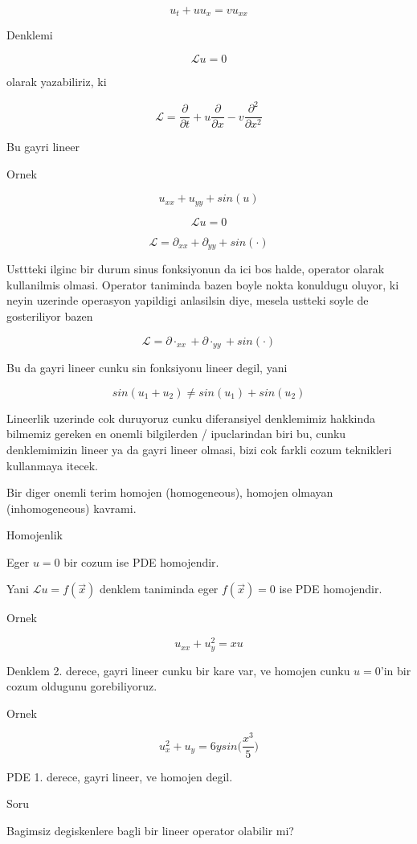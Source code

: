 \documentclass[12pt,fleqn]{article}
\begin{document}
\[ u_t + u u_x = v u_{xx} \]

Denklemi 

\[ \mathcal{L}u = 0 \]

olarak yazabiliriz, ki 

\[ \mathcal{L} = \frac{\partial }{\partial t} + 
u \frac{\partial }{\partial x} - v\frac{\partial ^2}{\partial x^2}
\]

Bu gayri lineer

Ornek

\[ u_{xx} + u_{yy} + sin(u) \]

\[ \mathcal{L} u = 0 \]

\[ \mathcal{L} = \partial_{xx} + \partial_{yy} + sin(\cdot) \]

Usttteki ilginc bir durum sinus fonksiyonun da ici bos halde, operator
olarak kullanilmis olmasi. Operator taniminda bazen boyle nokta konuldugu
oluyor, ki neyin uzerinde operasyon yapildigi anlasilsin diye, mesela
ustteki soyle de gosteriliyor bazen

\[ \mathcal{L} = \partial\cdot_{xx} + \partial\cdot_{yy} + sin(\cdot) \]

Bu da gayri lineer cunku sin fonksiyonu lineer degil, yani

\[ sin(u_1 + u_2) \ne sin(u_1) + sin(u_2) \]

Lineerlik uzerinde cok duruyoruz cunku diferansiyel denklemimiz hakkinda
bilmemiz gereken en onemli bilgilerden / ipuclarindan biri bu, cunku
denklemimizin lineer ya da gayri lineer olmasi, bizi cok farkli cozum
teknikleri kullanmaya itecek.

Bir diger onemli terim homojen (homogeneous), homojen olmayan
(inhomogeneous) kavrami. 

Homojenlik

Eger $u=0$ bir cozum ise PDE homojendir. 

Yani $\mathcal{L} u = f(\vec{x})$ denklem taniminda eger $f(\vec{x})=0$ ise PDE homojendir. 

Ornek

\[ u_{xx} + u_y^2 = xu \]

Denklem 2. derece, gayri lineer cunku bir kare var, ve homojen cunku
$u=0$'in bir cozum oldugunu gorebiliyoruz. 

Ornek

\[ u_x^2 + u_y = 6y sin\bigg(\frac{x^3}{5}\bigg) \]

PDE 1. derece, gayri lineer, ve homojen degil. 

Soru

Bagimsiz degiskenlere bagli bir lineer operator olabilir mi? 
\end{document}
